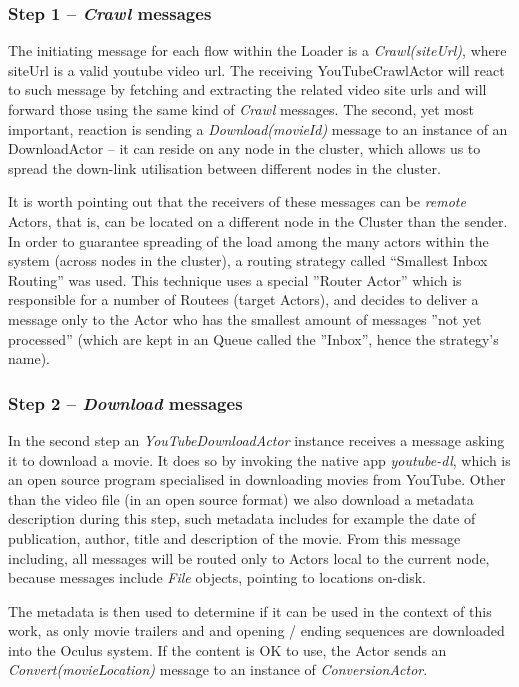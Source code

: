 \subsubsection{Step 1 -- \textit{Crawl} messages}
The initiating message for each flow within the Loader is a \textit{Crawl(siteUrl)}, where siteUrl is a valid youtube video url.
The receiving YouTubeCrawlActor will react to such message by fetching and extracting the related video site urls and will forward those using the same kind of \textit{Crawl} messages. The second, yet most important, reaction is sending a \textit{Download(movieId)} message to an instance of an DownloadActor -- it  can reside on any node in the cluster, which allows us to spread the down-link utilisation between different nodes in the cluster.

It is worth pointing out that the receivers of these messages can be \textit{remote} Actors, that is, can be located on a different node in the Cluster than the sender. In order to guarantee spreading of the load among the many actors within the system (across nodes in the cluster), a routing strategy called ``Smallest Inbox Routing'' was used. This technique uses a special ''Router Actor'' which is responsible for a number of Routees (target Actors), and decides to deliver a message only to the Actor who has the smallest amount of messages ''not yet processed'' (which are kept in an Queue called the ''Inbox'', hence the strategy's name).

\subsubsection{Step 2 -- \textit{Download} messages}
In the second step an \textit{YouTubeDownloadActor} instance receives a message asking it to download a movie.
It does so by invoking the native app \textit{youtube-dl}, which is an open source program specialised in downloading movies from YouTube.
Other than the video file (in an open source format) we also download a metadata description during this step, such metadata includes for example the date of publication, author, title and description of the movie. From this message including, all messages will be routed only to Actors local to the current node, because messages include \textit{File} objects, pointing to locations on-disk.

The metadata is then used to determine if it can be used in the context of this work, as only movie trailers and and opening / ending sequences are downloaded into the Oculus system. If the content is OK to use, the Actor sends an \textit{Convert(movieLocation)} message to an instance of \textit{ConversionActor}.

